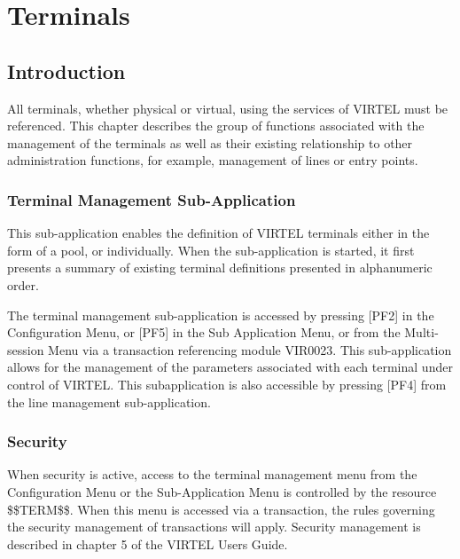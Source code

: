 \documentclass[letterpaper,10pt,english]{sphinxmanual}
\begin{document}

\chapter{Terminals}
\label{\detokenize{connectivity_guide:index-94}}\label{\detokenize{connectivity_guide:terminals}}

\section{Introduction}
\label{\detokenize{connectivity_guide:id48}}
All terminals, whether physical or virtual, using the services of VIRTEL must be referenced. This chapter describes the group of functions associated with the management of the terminals as well as their existing relationship to other administration functions, for example, management of lines or entry points.


\subsection{Terminal Management Sub-Application}
\label{\detokenize{connectivity_guide:index-95}}\label{\detokenize{connectivity_guide:terminal-management-sub-application}}
This sub-application enables the definition of VIRTEL terminals either in the form of a pool, or individually. When the sub-application is started, it first presents a summary of existing terminal definitions presented in alphanumeric order.

The terminal management sub-application is accessed by pressing {[}PF2{]} in the Configuration Menu, or {[}PF5{]} in the Sub Application Menu, or from the Multi-session Menu via a transaction referencing module VIR0023. This sub-application allows for the management of the parameters associated with each terminal under control of VIRTEL. This subapplication
is also accessible by pressing {[}PF4{]} from the line management sub-application.


\subsection{Security}
\label{\detokenize{connectivity_guide:index-96}}\label{\detokenize{connectivity_guide:id49}}
When security is active, access to the terminal management menu from the Configuration Menu or the Sub-Application Menu is controlled by the resource \$\$TERM\$\$. When this menu is accessed via a transaction, the rules governing the security management of transactions will apply. Security management is described in chapter 5 of the VIRTEL Users Guide.
\end{document}
